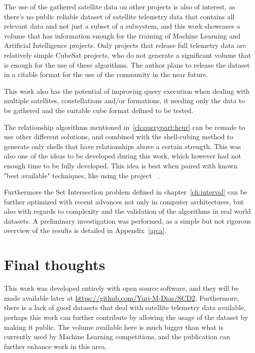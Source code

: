 The use of the gathered satellite data on other projects is also of interest, as there's no public reliable dataset of satellite telemetry data that contains all relevant data and not just a subset of a subsystem, and this work showcases a volume that has information enough for the training of Machine Learning and Artificial Intelligence projects.
Only projects that release full telemetry data are relatively simple CubeSat projects, who do not generate a significant volume that is enough for the use of these algorithms.
The author plans to release the dataset in a citable format for the use of the community in the near future.

This work also has the potential of improving query execution when dealing with multiple satellites, constellations and/or formations, it needing only the data to be gathered and the suitable cube format defined to be tested.

The relationship algorithms mentioned in~\autoref{ch:querypart:heur} can be remade to use other different solutions, and combined with the shell-cubing method to generate only shells that have relationships above a certain strength.
This was also one of the ideas to be developed during this work, which however had not enough time to be fully developed.
This idea is best when paired with known "best available" techniques, like using the project ~\cite{LibrespacefoundationPolarisPolaris2021}.

Furthermore the Set Intersection problem defined in chapter~\ref{ch:interval} can be further optimized with recent advances not only in computer architectures, but also with regards to complexity and the validation of the algorithms in real world datasets.
A preliminary investigation was performed, as a simple but not rigorous overview of the results is detailed in Appendix~\ref{ap:a}.

\section{Final thoughts}\label{ch:concl:future}


This work was developed entirely with open source software, and they will be made available later at \url{https://github.com/Yuri-M-Dias/SCD2}.
Furthermore, there is a lack of good datasets that deal with satellite telemetry data available, perhaps this work can further contribute by allowing the usage of the dataset by making it public.
The volume available here is much bigger than what is currently used by Machine Learning competitions, and the publication can further enhance work in this area.


